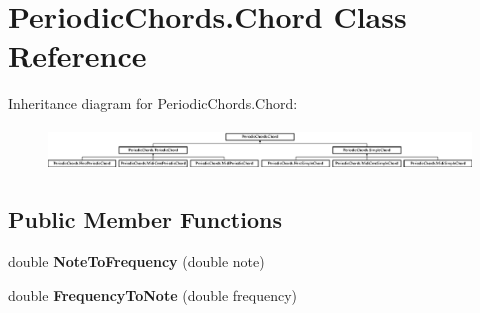 \hypertarget{class_periodic_chords_1_1_chord}{\section{Periodic\+Chords.\+Chord Class Reference}
\label{class_periodic_chords_1_1_chord}
}
Inheritance diagram for Periodic\+Chords.\+Chord\+:\begin{figure}[H]
\begin{center}
\leavevmode
\includegraphics[height=1.147541cm]{class_periodic_chords_1_1_chord}
\end{center}
\end{figure}
\subsection*{Public Member Functions}
\begin{DoxyCompactItemize}
\item 
\hypertarget{class_periodic_chords_1_1_chord_a833cdd245bc463ddb56e162617fd6a5b}{double {\bfseries Note\+To\+Frequency} (double note)}\label{class_periodic_chords_1_1_chord_a833cdd245bc463ddb56e162617fd6a5b}

\item 
\hypertarget{class_periodic_chords_1_1_chord_a3799e69892f39fbcff97d5033febb188}{double {\bfseries Frequency\+To\+Note} (double frequency)}\label{class_periodic_chords_1_1_chord_a3799e69892f39fbcff97d5033febb188}

\end{DoxyCompactItemize}
